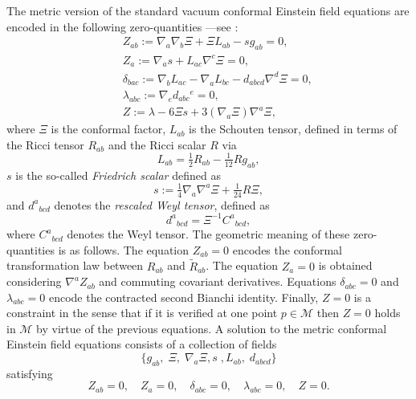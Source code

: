 \documentclass[10pt,a4paper]{article}
\theoremstyle{plain}
\begin{document}
The metric version of the standard vacuum conformal Einstein field
equations are encoded in the following zero-quantities ---see
\cite{Fri81a,Fri81b,Fri82,Fri83}:
\begin{subequations}\label{CFE_tensor_zeroquants}
\begin{eqnarray}
&& Z_{ab} := \nabla_{a}\nabla_{b}\Xi +\Xi L_{ab} - s g_{ab}=0 ,
 \label{StandardCEFEsecondderivativeCF}\\
&& Z_{a} := \nabla_{a}s +L_{ac} \nabla ^{c}\Xi=0
 , \label{standardCEFEs}\\ && \delta_{bac} :=
 \nabla_{b}L_{ac}-\nabla_{a}L_{bc} - d_{abcd}\nabla^d{}\Xi =0
 , \label{standardCEFESchouten}\\ && \lambda_{abc}:=
 \nabla_{e}d_{abc}{}^{e}=0 , \label{standardCEFErescaledWeyl}\\ && Z
 := \lambda - 6 \Xi s + 3 (\nabla_{a}\Xi) \nabla^{a}\Xi,
\label{standardCFEconstraintFriedrichScalar}
\end{eqnarray}
\end{subequations}
where $\Xi$ is the conformal factor, $L_{ab}$ is the Schouten tensor,
defined in terms of the Ricci tensor $R_{ab}$ and the Ricci scalar $R$
via
\begin{equation}\label{SchoutenDefinition}
L_{ab}=\tfrac{1}{2}R_{ab}-\tfrac{1}{12}Rg_{ab},
\end{equation}
 $s$ is the so-called \emph{Friedrich scalar} defined as
\begin{equation}\label{s-definition}
s:= \tfrac{1}{4}\nabla_{a}\nabla^{a}\Xi + \tfrac{1}{24}R\Xi,
\end{equation}
and $d^{a}{}_{bcd}$ denotes the \emph{rescaled Weyl tensor}, defined
as
\[d^{a}{}_{bcd}=\Xi^{-1}C^{a}{}_{bcd},\]
where $C^{a}{}_{bcd}$ denotes the Weyl tensor.  The geometric meaning
of these zero-quantities is as follows. The equation $Z_{ab}=0$
encodes the conformal transformation law between ${R}_{ab}$ and
$\tilde{R}_{ab}$.  The equation $Z_{a}=0$ is obtained considering
$\nabla^{a}Z_{ab}$ and commuting covariant derivatives.  Equations
$\delta_{abc}=0$ and $\lambda_{abc}=0$ encode the contracted second
Bianchi identity. Finally, $Z=0$ is a constraint in the sense that if
it is verified at one point $p\in\mathcal{M}$ then $Z=0$ holds in
$\mathcal{M}$ by virtue of the previous equations.  A solution to the
metric conformal Einstein field equations consists of a collection of
fields
\[
\{g_{ab}, \; \Xi, \; \nabla_{a}\Xi,s\;,L_{ab},\; d_{abcd}\}
\]
satisfying
\begin{equation}\label{vanishing_CFEs_tensorial_zq}
  Z_{ab}=0, \quad Z_{a}=0, \quad \delta_{abc}=0, \quad \lambda_{abc}=0, \quad Z=0.
\end{equation}
\end{document}
